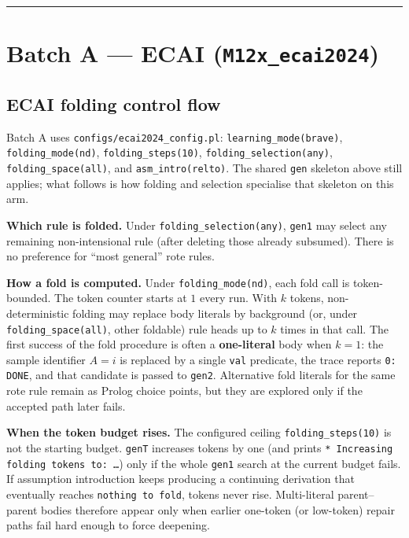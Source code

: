 \documentclass[11pt]{article}
\begin{document}
\medskip\hrule\medskip

\section{Batch A --- ECAI (\texttt{M12x\_ecai2024})}

\subsection{ECAI folding control flow}

Batch A uses \texttt{configs/ecai2024\_config.pl}: \texttt{learning\_mode(brave)}, \texttt{folding\_mode(nd)}, \texttt{folding\_steps(10)}, \texttt{folding\_selection(any)}, \texttt{folding\_space(all)}, and \texttt{asm\_intro(relto)}. The shared \texttt{gen} skeleton above still applies; what follows is how folding and selection specialise that skeleton on this arm.

\textbf{Which rule is folded.} Under \texttt{folding\_selection(any)}, \texttt{gen1} may select any remaining non-intensional rule (after deleting those already subsumed). There is no preference for ``most general'' rote rules.

\textbf{How a fold is computed.} Under \texttt{folding\_mode(nd)}, each fold call is token-bounded. The token counter starts at \(1\) every run. With \(k\) tokens, non-deterministic folding may replace body literals by background (or, under \texttt{folding\_space(all)}, other foldable) rule heads up to \(k\) times in that call. The first success of the fold procedure is often a \textbf{one-literal} body when \(k=1\): the sample identifier \(A=i\) is replaced by a single \texttt{val} predicate, the trace reports \texttt{0: DONE}, and that candidate is passed to \texttt{gen2}. Alternative fold literals for the same rote rule remain as Prolog choice points, but they are explored only if the accepted path later fails.

\textbf{When the token budget rises.} The configured ceiling \texttt{folding\_steps(10)} is not the starting budget. \texttt{genT} increases tokens by one (and prints \texttt{* Increasing folding tokens to: \ldots{}}) only if the whole \texttt{gen1} search at the current budget fails. If assumption introduction keeps producing a continuing derivation that eventually reaches \texttt{nothing to fold}, tokens never rise. Multi-literal parent--parent bodies therefore appear only when earlier one-token (or low-token) repair paths fail hard enough to force deepening.
\end{document}
